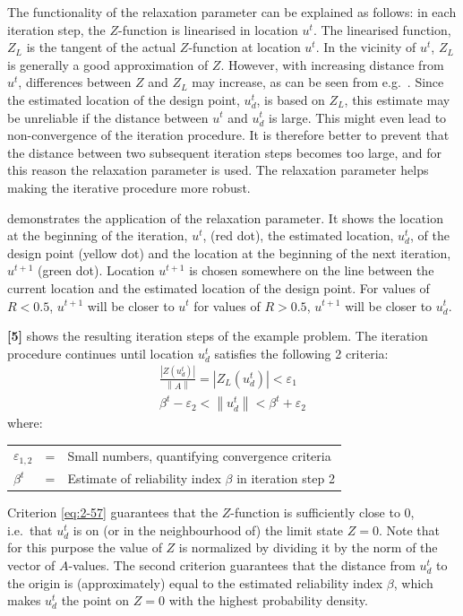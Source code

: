 The functionality of the relaxation parameter can be explained as follows: in each iteration step, the $Z$-function is linearised in location $u^t$. The linearised function, $Z_L$ is the tangent of the actual $Z$-function at location $u^t$. In the vicinity of $u^t$, $Z_L$ is generally a good approximation of $Z$. However, with increasing distance from $u^t$, differences between $Z$ and $Z_L$ may increase, as can be seen from e.g.\ . Since the estimated location of the design point, $u_d^t$, is based on $Z_L$, this estimate may be unreliable if the distance between $u^t$ and $u_d^t$ is large. This might even lead to non-convergence of the iteration procedure. It is therefore better to prevent that the distance between two subsequent iteration steps becomes too large, and for this reason the relaxation parameter is used. The relaxation parameter helps making the iterative procedure more robust.

 demonstrates the application of the relaxation parameter. It shows the location at the beginning of the iteration, $u^t$, (red dot), the estimated location, $u_d^t$, of the design point (yellow dot) and the location at the beginning of the next iteration, $u^{t+1}$ (green dot). Location $u^{t+1}$ is chosen somewhere on the line between the current location and the estimated location of the design point. For values of $R<0.5$, $u^{t+1}$ will be closer to $u^t$ for values of $R>0.5$, $u^{t+1}$ will be closer to $u_d^t$. 

\textbf{[5]}  shows the resulting iteration steps of the example problem. The iteration procedure continues until location $u_d^t$ satisfies the following 2 criteria: 
\begin{align}
\frac{\left|Z\left(u_{d}^{t} \right)\right|}{\left\| A\right\| } =\left|Z_{L} \left(u_{d}^{t} \right)\right|<\varepsilon _{1} \label{eq:2-57} \\
\beta ^{t} -\varepsilon _{2} <\left\| u_{d}^{t} \right\| <\beta ^{t} +\varepsilon _{2} \label{eq:2-58}  
\end{align}
where:

\begin{tabular}{p{0.2in}p{0.2in}p{4in}} 
$\varepsilon_{1,2}$ & = & Small numbers, quantifying convergence criteria \\  
$\beta^t$ & = & Estimate of reliability index $\beta$ in iteration step 2 \\  
\end{tabular}

Criterion \eqref{eq:2-57} guarantees that the $Z$-function is sufficiently close to $0$, i.e.\ that $u_d^t$ is on (or in the neighbourhood of) the limit state $Z=0$. Note that for this purpose the value of $Z$ is normalized by dividing it by the norm of the vector of $A$-values. The second criterion guarantees that the distance from $u_d^t$ to the origin is (approximately) equal to the estimated reliability index $\beta$, which makes $u_d^t$ the point on $Z=0$ with the highest probability density. 

